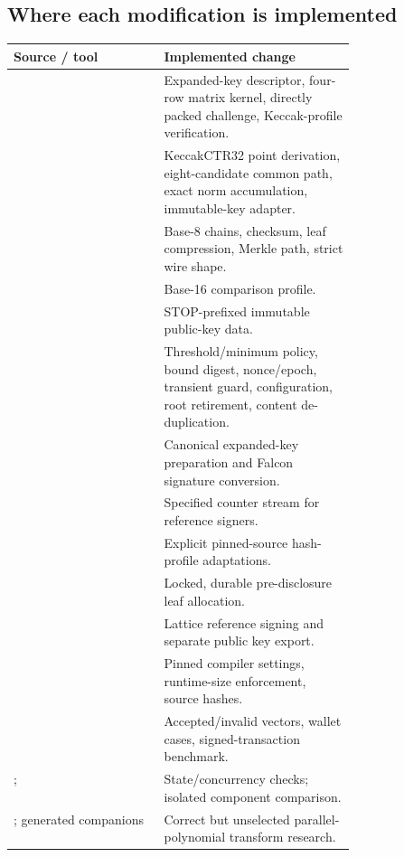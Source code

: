 \documentclass[11pt,a4paper]{article}
\begin{document}
\subsection{Where each modification is implemented}
{\small
\begin{tabularx}{\linewidth}{P{0.44\linewidth}Y}
\toprule
\textbf{Source / tool} & \textbf{Implemented change}\\
\midrule
{} & Expanded-key descriptor, four-row matrix kernel, directly packed challenge, Keccak-profile verification.\\
 & KeccakCTR32 point derivation, eight-candidate common path, exact norm accumulation, immutable-key adapter.\\
 & Base-8 chains, checksum, leaf compression, Merkle path, strict wire shape.\\
 & Base-16 comparison profile.\\
 & STOP-prefixed immutable public-key data.\\
 & Threshold/minimum policy, bound digest, nonce/epoch, transient guard, configuration, root retirement, content de-duplication.\\
 & Canonical expanded-key preparation and Falcon signature conversion.\\
 & Specified counter stream for reference signers.\\
 & Explicit pinned-source hash-profile adaptations.\\
 & Locked, durable pre-disclosure leaf allocation.\\
 & Lattice reference signing and separate public key export.\\
 & Pinned compiler settings, runtime-size enforcement, source hashes.\\
 & Accepted/invalid vectors, wallet cases, signed-transaction benchmark.\\
;  & State/concurrency checks; isolated component comparison.\\
; generated companions & Correct but unselected parallel-polynomial transform research.\\
\bottomrule
\end{tabularx}}
\end{document}
